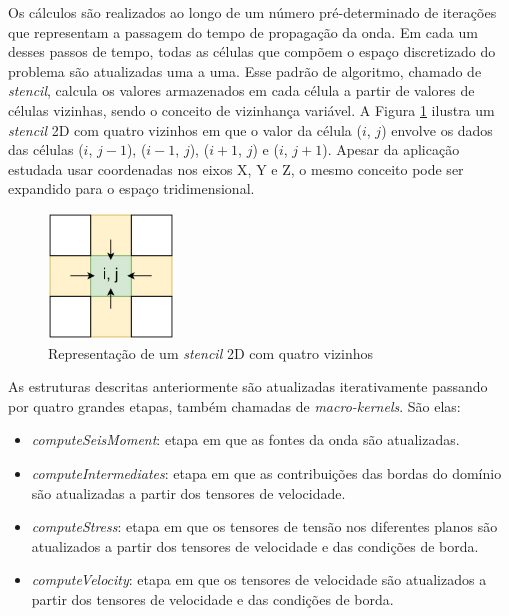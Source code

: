 \documentclass[cic,tc]{iiufrgs}
\begin{document}
Os cálculos são realizados ao longo de um número pré-determinado de iterações que representam a passagem do tempo de propagação da onda.
Em cada um desses passos de tempo, todas as células que compõem o espaço discretizado do problema são atualizadas uma a uma. Esse
padrão de algoritmo, chamado de \textit{stencil}, calcula os valores armazenados em cada célula a partir de valores de células vizinhas, sendo o conceito de vizinhança variável. A Figura
\ref{fig:stencil} ilustra um \textit{stencil} 2D com quatro vizinhos em que o valor da célula ($i$, $j$) envolve os dados das células ($i$, $j-1$), ($i-1$, $j$), ($i+1$, $j$) e ($i$, $j+1$).
Apesar da aplicação estudada usar coordenadas nos eixos X, Y e Z, o mesmo conceito pode ser expandido para o espaço tridimensional.

\begin{figure}[!htb]
    \caption{Representação de um \textit{stencil} 2D com quatro vizinhos}
    \begin{center}
      \includegraphics[width=9em]{stencil}
    \end{center}
    \label{fig:stencil}
\end{figure}

As estruturas descritas anteriormente são atualizadas iterativamente passando por quatro grandes etapas, também chamadas de \textit{macro-kernels}. São elas:

\begin{itemize}
\item{\textit{computeSeisMoment}:} etapa em que as fontes da onda são atualizadas.
\item{\textit{computeIntermediates}:} etapa em que as contribuições das bordas do domínio são atualizadas a partir dos tensores de velocidade.
\item{\textit{computeStress}:} etapa em que os tensores de tensão nos diferentes planos são atualizados a partir dos tensores de velocidade e das condições de borda.
\item{\textit{computeVelocity}:} etapa em que os tensores de velocidade são atualizados a partir dos tensores de velocidade e das condições de borda.
\end{itemize}
\end{document}
